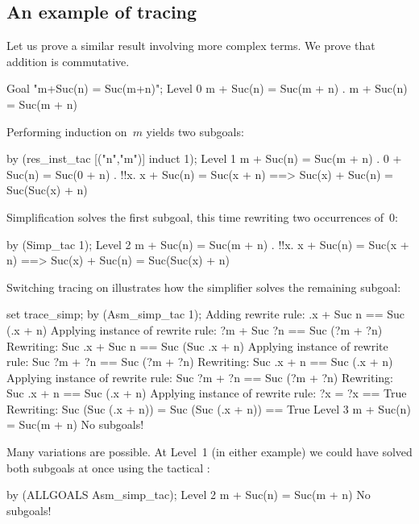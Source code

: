 \subsection{An example of tracing}

Let us prove a similar result involving more complex terms.  We prove
that addition is commutative.
\begin{ttbox}
Goal "m+Suc(n) = Suc(m+n)";
{\out Level 0}
{\out m + Suc(n) = Suc(m + n)}
{. m + Suc(n) = Suc(m + n)}
\end{ttbox}
Performing induction on~$m$ yields two subgoals:
\begin{ttbox}
by (res_inst_tac [("n","m")] induct 1);
{\out Level 1}
{\out m + Suc(n) = Suc(m + n)}
{. 0 + Suc(n) = Suc(0 + n)}
{. !!x. x + Suc(n) = Suc(x + n) ==>}
{\out          Suc(x) + Suc(n) = Suc(Suc(x) + n)}
\end{ttbox}
Simplification solves the first subgoal, this time rewriting two
occurrences of~0:
\begin{ttbox}
by (Simp_tac 1);
{\out Level 2}
{\out m + Suc(n) = Suc(m + n)}
{. !!x. x + Suc(n) = Suc(x + n) ==>}
{\out          Suc(x) + Suc(n) = Suc(Suc(x) + n)}
\end{ttbox}
Switching tracing on illustrates how the simplifier solves the remaining
subgoal: 
\begin{ttbox}
set trace_simp;
by (Asm_simp_tac 1);
\ttbreak
{\out Adding rewrite rule:}
{\out .x + Suc n == Suc (.x + n)}
\ttbreak
{\out Applying instance of rewrite rule:}
{\out ?m + Suc ?n == Suc (?m + ?n)}
{\out Rewriting:}
{\out Suc .x + Suc n == Suc (Suc .x + n)}
\ttbreak
{\out Applying instance of rewrite rule:}
{\out Suc ?m + ?n == Suc (?m + ?n)}
{\out Rewriting:}
{\out Suc .x + n == Suc (.x + n)}
\ttbreak
{\out Applying instance of rewrite rule:}
{\out Suc ?m + ?n == Suc (?m + ?n)}
{\out Rewriting:}
{\out Suc .x + n == Suc (.x + n)}
\ttbreak
{\out Applying instance of rewrite rule:}
{\out ?x = ?x == True}
{\out Rewriting:}
{\out Suc (Suc (.x + n)) = Suc (Suc (.x + n)) == True}
\ttbreak
{\out Level 3}
{\out m + Suc(n) = Suc(m + n)}
{\out No subgoals!}
\end{ttbox}
Many variations are possible.  At Level~1 (in either example) we could have
solved both subgoals at once using the tactical :
\begin{ttbox}
by (ALLGOALS Asm_simp_tac);
{\out Level 2}
{\out m + Suc(n) = Suc(m + n)}
{\out No subgoals!}
\end{ttbox}


